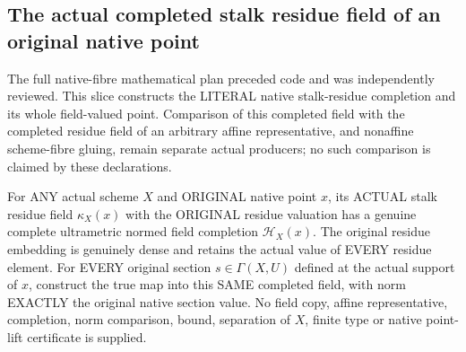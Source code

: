 \subsection{The actual completed stalk residue field of an original native point}

The full native-fibre mathematical plan preceded code and was independently
reviewed. This slice constructs the LITERAL native stalk-residue completion
and its whole field-valued point. Comparison of this completed field with the
completed residue field of an arbitrary affine representative, and nonaffine
scheme-fibre gluing, remain separate actual producers; no such comparison is
claimed by these declarations.

\begin{theorem}
\label{scheme:actual-native-completed-residue-field}
\leanok
{}
For ANY actual scheme $X$ and ORIGINAL native point $x$, its ACTUAL stalk
residue field $\kappa_X(x)$ with the ORIGINAL residue valuation has a genuine
complete ultrametric normed field completion $\mathcal H_X(x)$. The original
residue embedding is genuinely dense and retains the actual value of EVERY
residue element. For EVERY original section $s\in\Gamma(X,U)$ defined at
the actual support of $x$, construct the true map into this SAME completed
field, with norm EXACTLY the original native section value.
No field copy, affine representative, completion, norm comparison, bound,
separation of $X$, finite type or native point-lift certificate is supplied.
\end{theorem}
